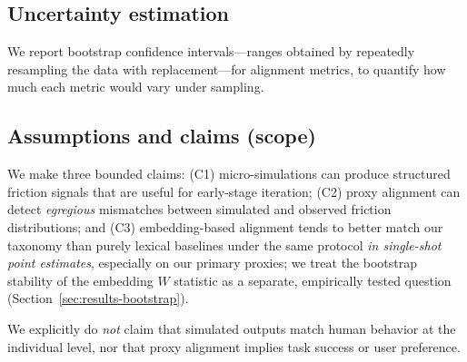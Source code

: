 \subsection{Uncertainty estimation}
We report bootstrap confidence intervals---ranges obtained by repeatedly resampling the data with replacement---for alignment metrics, to quantify how much each metric would vary under sampling.

\subsection{Assumptions and claims (scope)}
We make three bounded claims:
(C1) micro-simulations can produce structured friction signals that are useful for early-stage iteration;
(C2) proxy alignment can detect \emph{egregious} mismatches between simulated and observed friction distributions; and
(C3) embedding-based alignment tends to better match our taxonomy than purely lexical baselines under the same protocol \emph{in single-shot point estimates}, especially on our primary proxies; we treat the bootstrap stability of the embedding $W$ statistic as a separate, empirically tested question (Section~\ref{sec:results-bootstrap}).

We explicitly do \emph{not} claim that simulated outputs match human behavior at the individual level, nor that proxy alignment implies task success or user preference.
